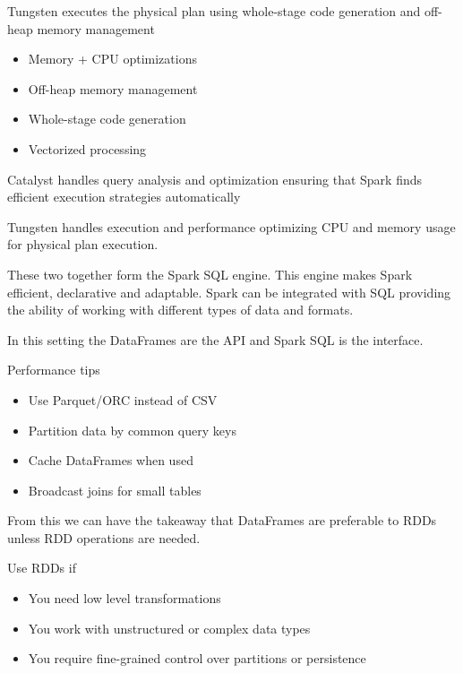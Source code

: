 Tungsten executes the physical plan using whole-stage code generation and off-heap memory management

\begin{itemize}
    \item Memory + CPU optimizations
    \item Off-heap memory management
    \item Whole-stage code generation
    \item Vectorized processing
\end{itemize}

Catalyst \ra handles query analysis and optimization ensuring that Spark finds efficient execution strategies automatically

\vspace{10pt}

Tungsten \ra handles execution and performance optimizing CPU and memory usage for physical plan execution.

\vspace{10pt}

These two together form the Spark SQL engine. This engine makes Spark efficient, declarative and adaptable. Spark can be integrated with SQL providing the ability of working with different types of data and formats.

\vspace{10pt}

In this setting the DataFrames are the API and Spark SQL is the interface.

\vspace{10pt}

Performance tips

\begin{itemize}
    \item Use Parquet/ORC instead of CSV
    \item Partition data by common query keys
    \item Cache DataFrames when used
    \item Broadcast joins for small tables
\end{itemize}

From this we can have the takeaway that DataFrames are preferable to RDDs unless RDD operations are needed.

\vspace{10pt}

Use RDDs if
\begin{itemize}
    \item You need low level transformations
    \item You work with unstructured or complex data types
    \item You require fine-grained control over partitions or persistence
\end{itemize}

